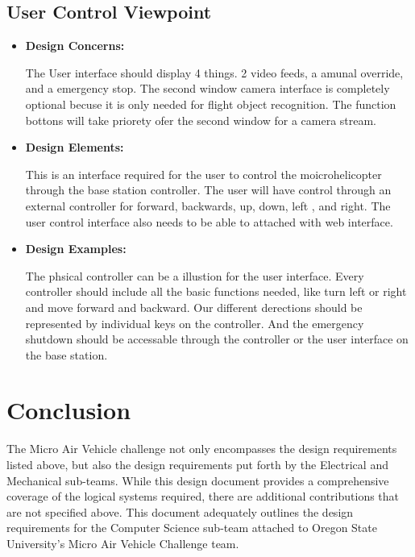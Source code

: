 \documentclass[onecolumn, draftclsnofoot,10pt, compsoc]{IEEEtran}
\begin{document}
\subsection{User Control Viewpoint}%
\begin{itemize}
\item{ \textbf{Design Concerns:}}

The User interface should display 4 things. 2 video feeds, a amunal override, and a emergency stop. The second window camera interface is completely optional becuse it is only needed for flight object recognition. The function bottons will take priorety ofer the second window for a camera stream. \\
\item{ \textbf{Design Elements:}}

This is an interface required for the user to control the moicrohelicopter through the base station controller. The user will have control through an external controller for forward, backwards, up, down, left , and right. The user control interface also needs to be able to attached with web interface. \\ 
\item{ \textbf{Design Examples:}} %

The phsical controller can be a illustion for the user interface. Every controller should include all the basic functions needed, like turn left or right and move forward and backward. Our different derections should be represented by individual keys on the controller. And the emergency shutdown should be accessable through the controller or the user interface on the base station.
\end{itemize}


\section{Conclusion}

The Micro Air Vehicle challenge not only encompasses the design requirements listed above, but also the design requirements put forth by the Electrical and Mechanical sub-teams. While this design document provides a comprehensive coverage of the logical systems required, there are additional contributions that are not specified above. This document adequately outlines the design requirements for the Computer Science sub-team attached to Oregon State University's Micro Air Vehicle Challenge team. 




\end{document}
